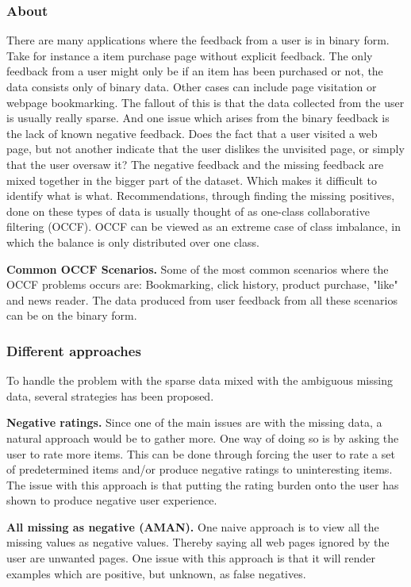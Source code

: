 \subsubsection{About}
There are many applications where the feedback from a user is in binary form.
Take for instance a item purchase page without explicit feedback.
The only feedback from a user might only be if an item has been purchased or not, the data consists only of binary data.
Other cases can include page visitation or webpage bookmarking.
The fallout of this is that the data collected from the user is usually really sparse.
And one issue which arises from the binary feedback is the lack of known negative feedback.
Does the fact that a user visited a web page, but not another indicate that the user dislikes the unvisited page, or simply that the user oversaw it?
The negative feedback and the missing feedback are mixed together in the bigger part of the dataset.
Which makes it difficult to identify what is what.
Recommendations, through finding the missing positives, done on these types of data is usually thought of as one-class collaborative filtering (OCCF).
OCCF can be viewed as an extreme case of class imbalance, in which the balance is only distributed over one class. %

\textbf{Common OCCF Scenarios.}
Some of the most common scenarios where the OCCF problems occurs are:
Bookmarking, click history, product purchase, "like" and news reader.
The data produced from user feedback from all these scenarios can be on the binary form.

\subsubsection{Different approaches}
To handle the problem with the sparse data mixed with the ambiguous missing data, several strategies has been proposed.

\textbf{Negative ratings.}
Since one of the main issues are with the missing data, a natural approach would be to gather more.
One way of doing so is by asking the user to rate more items.
This can be done through forcing the user to rate a set of predetermined items and/or produce negative ratings to uninteresting items.
The issue with this approach is that putting the rating burden onto the user has shown to produce negative user experience. %

\textbf{All missing as negative (AMAN).}
One naive approach is to view all the missing values as negative values.
Thereby saying all web pages ignored by the user are unwanted pages.
One issue with this approach is that it will render examples which are positive, but unknown, as false negatives.


